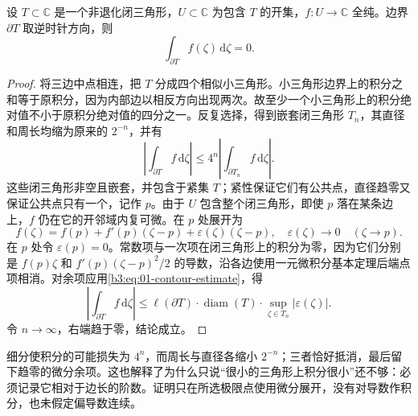 \begin{lemma}\label{b3:lem:01-goursat-local}
设 \(T\subset\mathbb C\) 是一个非退化闭三角形，\(U\subset\mathbb C\) 为包含 \(T\) 的开集，\(f:U\to\mathbb C\) 全纯。边界 \(\partial T\) 取逆时针方向，则
\[
\int_{\partial T}f(\zeta)\,\mathrm{d}\zeta=0.
\]
\end{lemma}
\begin{proof}
将三边中点相连，把 \(T\) 分成四个相似小三角形。小三角形边界上的积分之和等于原积分，因为内部边以相反方向出现两次。故至少一个小三角形上的积分绝对值不小于原积分绝对值的四分之一。反复选择，得到嵌套闭三角形 \(T_n\)，其直径和周长均缩为原来的 \(2^{-n}\)，并有
\[
\left|\int_{\partial T}f\,\mathrm{d}\zeta\right|
\leq4^n\left|\int_{\partial T_n}f\,\mathrm{d}\zeta\right|.
\]
这些闭三角形非空且嵌套，并包含于紧集 \(T\)；紧性保证它们有公共点，直径趋零又保证公共点只有一个，记作 \(p\)。由于 \(U\) 包含整个闭三角形，即使 \(p\) 落在某条边上，\(f\) 仍在它的开邻域内复可微。在 \(p\) 处展开为
\[
f(\zeta)=f(p)+f'(p)(\zeta-p)+\varepsilon(\zeta)(\zeta-p),
\quad\varepsilon(\zeta)\to0\quad(\zeta\to p).
\]
在 \(p\) 处令 \(\varepsilon(p)=0\)。常数项与一次项在闭三角形上的积分为零，因为它们分别是 \(f(p)\zeta\) 和 \(f'(p)(\zeta-p)^2/2\) 的导数，沿各边使用一元微积分基本定理后端点项相消。对余项应用\eqref{b3:eq:01-contour-estimate}，得
\[
\left|\int_{\partial T}f\,\mathrm{d}\zeta\right|
\leq\ell(\partial T)\cdot\operatorname{diam}(T)
\cdot\sup_{\zeta\in T_n}|\varepsilon(\zeta)|.
\]
令 \(n\to\infty\)，右端趋于零，结论成立。
\end{proof}

细分使积分的可能损失为 \(4^n\)，而周长与直径各缩小 \(2^{-n}\)；三者恰好抵消，最后留下趋零的微分余项。这也解释了为什么只说“很小的三角形上积分很小”还不够：必须记录它相对于边长的阶数。证明只在所选极限点使用微分展开，没有对导数作积分，也未假定偏导数连续。

